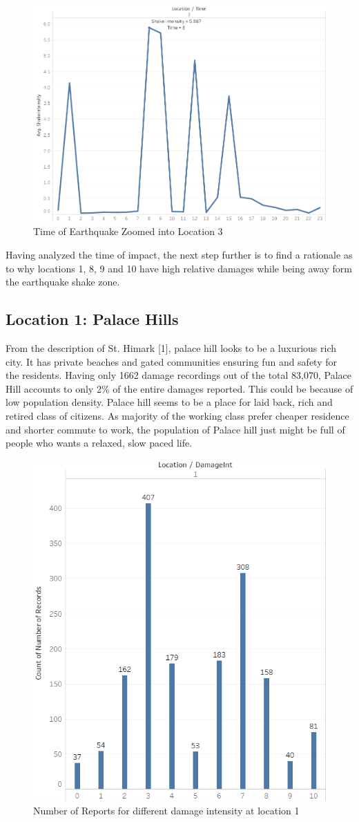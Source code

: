 \documentclass[12pt]{extarticle}
\begin{document}
\begin{figure}[H]
\centering
	\includegraphics[width=0.5\linewidth]{Images/timeZoom.png}
	\caption{Time of Earthquake Zoomed into Location 3}
	\label{fig:timeZoom}
\end{figure}

Having analyzed the time of impact, the next step further is to find a rationale as to why locations 1, 8, 9 and 10 have high relative damages while being away form the earthquake shake zone. \\

\subsection{Location 1: Palace Hills}
From the description of St. Himark [1], palace hill looks to be a luxurious rich city. It has private beaches and gated communities ensuring fun and safety for the residents. Having only 1662 damage recordings out of the total 83,070, Palace Hill accounts to only 2\% of the entire damages reported. This could be because of low population density. Palace hill seems to be a place for laid back, rich and retired class of citizens. As majority of the working class prefer cheaper residence and shorter commute to work, the population of Palace hill just might be full of people who wants a relaxed, slow paced life. \\

\begin{figure}[H]
\centering
	\includegraphics[width=0.4\linewidth]{Images/Loc1Mode.png}
	\caption{Number of Reports for different damage intensity at location 1 }
	\label{fig:mode}
\end{figure}
\end{document}
